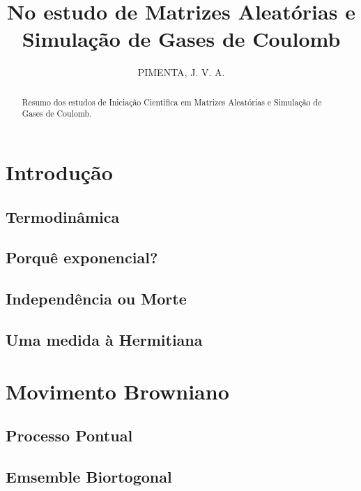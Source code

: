 \documentclass[11pt,oneside,a4paper]{report}
\title{
	{No estudo de Matrizes Aleatórias e Simulação de Gases de Coulomb}\\
}
\author{PIMENTA, J. V. A.}
\begin{document}
\maketitle

\begin{abstract}
	Resumo dos estudos de Iniciação Científica em Matrizes Aleatórias e Simulação de Gases de Coulomb.
\end{abstract}

\tableofcontents

\chapter{Introdução}


\section{Termodinâmica}


\section{Porquê exponencial?}


\section{Independência ou Morte}


\section{Uma medida à Hermitiana}


\chapter{Movimento Browniano}


\section{Processo Pontual}


\section{Emsemble Biortogonal}

\end{document}
